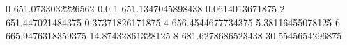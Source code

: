 0 651.0733032226562 0.0
1 651.1347045898438 0.0614013671875
2 651.447021484375 0.37371826171875
4 656.4544677734375 5.38116455078125
6 665.9476318359375 14.87432861328125
8 681.6278686523438 30.5545654296875
